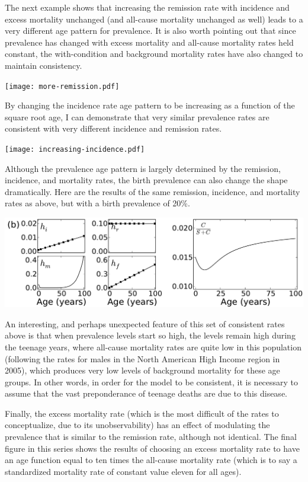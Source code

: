 The next example shows that increasing the remission rate with
incidence and excess mortality unchanged (and all-cause mortality
unchanged as well) leads to a very different age pattern for
prevalence. It is also worth pointing out that since prevalence has
changed with excess mortality and all-cause mortality rates held
constant, the with-condition and background mortality rates have also
changed to maintain consistency.

\texttt{[image: more-remission.pdf]}

By changing the incidence rate age pattern to be increasing as a
function of the square root age, I can demonstrate that very similar
prevalence rates are consistent with very different incidence and
remission rates.

\texttt{[image: increasing-incidence.pdf]}

Although the prevalence age pattern is largely determined by the
remission, incidence, and mortality rates, the birth prevalence can
also change the shape dramatically.  Here are the results of the same
remission, incidence, and mortality rates as above, but with a birth
prevalence of 20\%.

\includegraphics[width=\textwidth]{birth-prevalence.pdf}

An interesting, and perhaps unexpected feature of this set of
consistent rates above is that when prevalence levels start so high,
the levels remain high during the teenage years, where all-cause
mortality rates are quite low in this population (following the rates
for males in the North American High Income region in 2005), which
produces very low levels of background mortality for these age
groups. In other words, in order for the model to be consistent, it is
necessary to assume that the vast preponderance of teenage deaths are
due to this disease.

Finally, the excess mortality rate (which is the most difficult of the
rates to conceptualize, due to its unobservability) has an effect of
modulating the prevalence that is similar to the remission rate,
although not identical.  The final figure in this series shows the
results of choosing an excess mortality rate to have an age function
equal to ten times the all-cause mortality rate (which is to say a
standardized mortality rate of constant value eleven for all ages).

